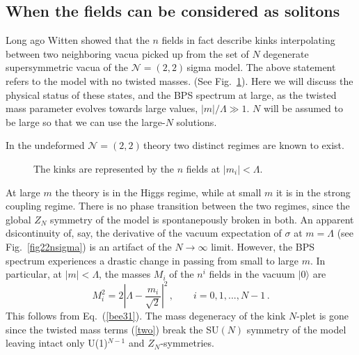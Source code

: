 \documentclass[epsfig,12pt]{article}
\def\beq{\begin{equation}}
\def\eeq{\end{equation}}
\newcommand{\ntt}{${\mathcal N}=(2,2)\,$}
\newcommand{\zn}{$Z_N$}
\def\beq{\begin{equation}}
\def\eeq{\end{equation}}
\begin{document}
{\subsection{When the  fields can be considered as solitons}
\label{wtnfcb}

Long ago Witten showed \cite{W79} that the $n$ fields in fact describe
kinks interpolating between two neighboring vacua picked up from the set of $N$ degenerate 
supersymmetric vacua
of the \ntt sigma model. The above statement refers to the model with no twisted masses.
(See Fig.~\ref{nkin}).
Here we will discuss the physical status of these states, and the BPS spectrum at large,
as the twisted mass parameter evolves towards large values, $|m|/\Lambda \gg1$.
$N$ will be assumed to be large so that we can use the large-$N$ solutions.

In the undeformed \ntt theory two distinct regimes are known to exist.
\begin{figure}
\epsfxsize=5cm
\centerline{\resizebox{5cm}{!}{}}
\caption{\small The kinks are represented by the $n$ fields at $|m_i|<\Lambda$. }
\label{nkin}
\end{figure}
At large $m$
the theory is in the Higgs regime, while at small $m$ it is in the
strong coupling regime.
There is no phase transition between the two regimes, since 
the global $Z_N$ symmetry of the model is spontanepously broken in both.
An apparent dsicontinuity of, say, the derivative of the vacuum expectation of $\sigma$ at
$m=\Lambda$ (see Fig.~\ref{fig22nsigma}) is an artifact of the $N\to\infty$ limit.
However, the BPS spectrum experiences a drastic change in passing from small to large $m$.
In particular, 
at $|m|<\Lambda$, the masses $M_i$ of the $n^i$ fields in the vacuum $|0\rangle$
are
\beq
M_i^2 = 2\left| \Lambda - \frac{m_i}{\sqrt 2}\right|^2\,,\qquad i=0,1, ..., N-1\,.
\label{nkma}
\eeq
This follows from Eq.~(\ref{bee31}). The mass degeneracy of the kink $N$-plet is gone
since the twisted mass terms (\ref{two}) break the SU$(N)$ symmetry of the model leaving intact only
U(1)$^{N-1}$ and \zn-symmetries.

}
\end{document}
